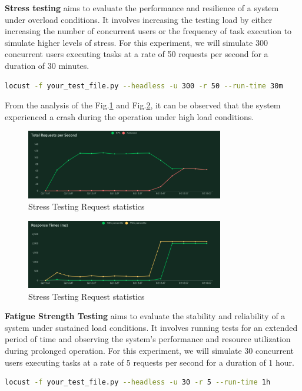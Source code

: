 \documentclass[journal]{IEEEtran}
\begin{document}
\textbf{Stress testing} aims to evaluate the performance and resilience of a system under overload conditions. It involves increasing the testing load by either increasing the number of concurrent users or the frequency of task execution to simulate higher levels of stress. For this experiment, we will simulate 300 concurrent users executing tasks at a rate of 50 requests per second for a duration of 30 minutes.
\begin{lstlisting}[label={lst:locustcmd},language=BASH,breaklines=true]
locust -f your_test_file.py --headless -u 300 -r 50 --run-time 30m 
\end{lstlisting}

From the analysis of the Fig.\ref{fig:stressreqstat} and Fig.\ref{fig:stressrespstat}, it can be observed that the system experienced a crash during the operation under high load conditions.

\begin{figure}[h]
  \centering
  \includegraphics[width=3.4in]{figures/stressreqstat.png}
  \caption{Stress Testing Request statistics}
  \label{fig:stressreqstat}
  \end{figure}

\begin{figure}[h]
  \centering
  \includegraphics[width=3.4in]{figures/stressrespstat.png}
  \caption{Stress Testing Request statistics}
  \label{fig:stressrespstat}
  \end{figure}

\textbf{Fatigue Strength Testing} aims to evaluate the stability and reliability of a system under sustained load conditions. It involves running tests for an extended period of time and observing the system's performance and resource utilization during prolonged operation. For this experiment, we will simulate 30 concurrent users executing tasks at a rate of 5 requests per second for a duration of 1 hour. 
\begin{lstlisting}[label={lst:locustcmd},language=BASH,breaklines=true]
locust -f your_test_file.py --headless -u 30 -r 5 --run-time 1h 
\end{lstlisting}
\end{document}
